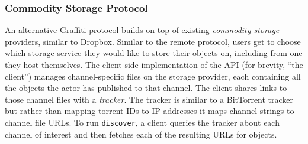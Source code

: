 
\subsubsection{Commodity Storage Protocol}
\label{above-and-below:commodity-storage-protocol}

An alternative Graffiti protocol builds on top of existing
\emph{commodity storage} providers,
similar to Dropbox.
Similar to the remote protocol, users get to choose which storage
service they would like to store their objects on, including
from one they host themselves.
The client-side implementation of the API (for brevity, ``the client'')
manages channel-specific files on the storage provider,
each containing all the objects the actor has published to that channel.
The client shares links to those channel files with a \emph{tracker}.
The tracker is similar to a BitTorrent tracker~\cite{bittorrent} but
rather than mapping torrent IDs to IP addresses
it maps channel strings to channel file URLs.
To run \texttt{discover}, a client queries the tracker
about each channel of interest and then fetches each of the resulting URLs for objects.



